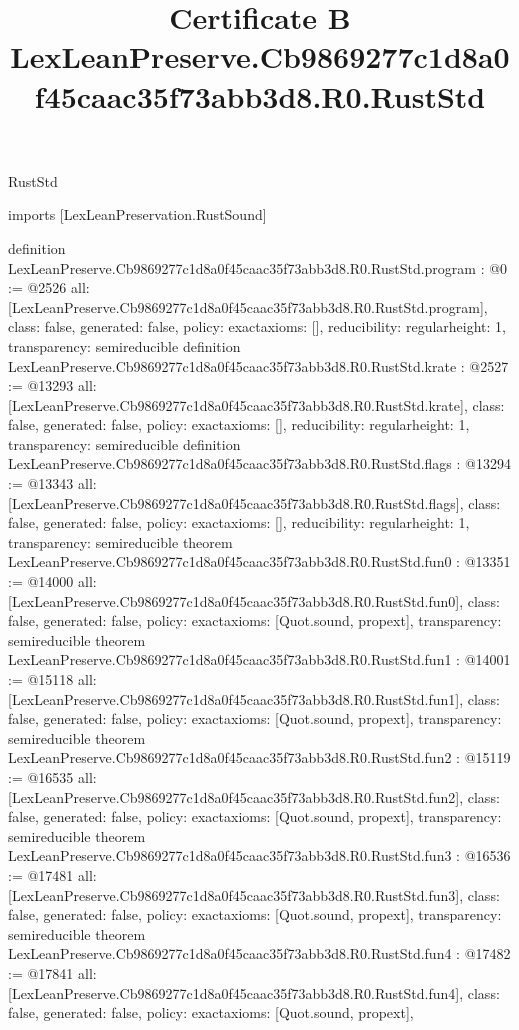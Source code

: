 \begin{lexlean}{RustStd}
\title{Certificate B LexLeanPreserve.Cb9869277c1d8a0f45caac35f73abb3d8.R0.RustStd}
\begin{coremodule}
imports [LexLeanPreservation.RustSound]

definition LexLeanPreserve.Cb9869277c1d8a0f45caac35f73abb3d8.R0.RustStd.program : @0 := @2526 {
  all: [LexLeanPreserve.Cb9869277c1d8a0f45caac35f73abb3d8.R0.RustStd.program],
  class: false,
  generated: false,
  policy: exact{axioms: []},
  reducibility: regular{height: 1},
  transparency: semireducible
}
definition LexLeanPreserve.Cb9869277c1d8a0f45caac35f73abb3d8.R0.RustStd.krate : @2527 := @13293 {
  all: [LexLeanPreserve.Cb9869277c1d8a0f45caac35f73abb3d8.R0.RustStd.krate],
  class: false,
  generated: false,
  policy: exact{axioms: []},
  reducibility: regular{height: 1},
  transparency: semireducible
}
definition LexLeanPreserve.Cb9869277c1d8a0f45caac35f73abb3d8.R0.RustStd.flags : @13294 := @13343 {
  all: [LexLeanPreserve.Cb9869277c1d8a0f45caac35f73abb3d8.R0.RustStd.flags],
  class: false,
  generated: false,
  policy: exact{axioms: []},
  reducibility: regular{height: 1},
  transparency: semireducible
}
theorem LexLeanPreserve.Cb9869277c1d8a0f45caac35f73abb3d8.R0.RustStd.fun0 : @13351 := @14000 {
  all: [LexLeanPreserve.Cb9869277c1d8a0f45caac35f73abb3d8.R0.RustStd.fun0],
  class: false,
  generated: false,
  policy: exact{axioms: [Quot.sound, propext]},
  transparency: semireducible
}
theorem LexLeanPreserve.Cb9869277c1d8a0f45caac35f73abb3d8.R0.RustStd.fun1 : @14001 := @15118 {
  all: [LexLeanPreserve.Cb9869277c1d8a0f45caac35f73abb3d8.R0.RustStd.fun1],
  class: false,
  generated: false,
  policy: exact{axioms: [Quot.sound, propext]},
  transparency: semireducible
}
theorem LexLeanPreserve.Cb9869277c1d8a0f45caac35f73abb3d8.R0.RustStd.fun2 : @15119 := @16535 {
  all: [LexLeanPreserve.Cb9869277c1d8a0f45caac35f73abb3d8.R0.RustStd.fun2],
  class: false,
  generated: false,
  policy: exact{axioms: [Quot.sound, propext]},
  transparency: semireducible
}
theorem LexLeanPreserve.Cb9869277c1d8a0f45caac35f73abb3d8.R0.RustStd.fun3 : @16536 := @17481 {
  all: [LexLeanPreserve.Cb9869277c1d8a0f45caac35f73abb3d8.R0.RustStd.fun3],
  class: false,
  generated: false,
  policy: exact{axioms: [Quot.sound, propext]},
  transparency: semireducible
}
theorem LexLeanPreserve.Cb9869277c1d8a0f45caac35f73abb3d8.R0.RustStd.fun4 : @17482 := @17841 {
  all: [LexLeanPreserve.Cb9869277c1d8a0f45caac35f73abb3d8.R0.RustStd.fun4],
  class: false,
  generated: false,
  policy: exact{axioms: [Quot.sound, propext]},
}
\end{coremodule}
\end{lexlean}
